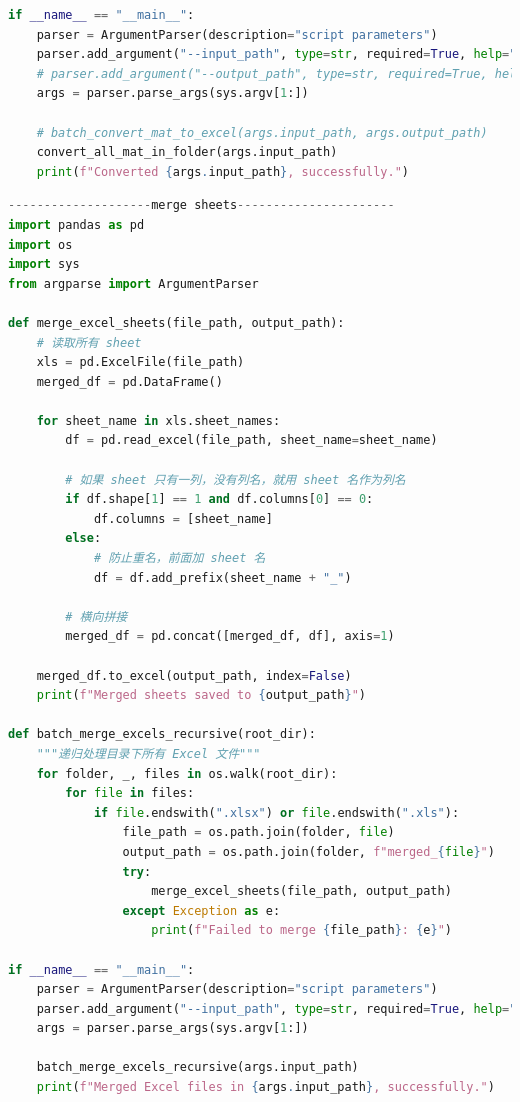 \documentclass[a4paper]{CPIPC}
\numberwithin{equation}{section}
\begin{document}
\begin{lstlisting}[language=Python]
if __name__ == "__main__":
    parser = ArgumentParser(description="script parameters")
    parser.add_argument("--input_path", type=str, required=True, help="Parent directory containing .mat files")
    # parser.add_argument("--output_path", type=str, required=True, help="Parent directory to save .xlsx files")
    args = parser.parse_args(sys.argv[1:])

    # batch_convert_mat_to_excel(args.input_path, args.output_path)
    convert_all_mat_in_folder(args.input_path)
    print(f"Converted {args.input_path}, successfully.")
\end{lstlisting}

\begin{lstlisting}[language=Python, caption=Merge Excel Sheets]
--------------------merge sheets----------------------
import pandas as pd
import os
import sys
from argparse import ArgumentParser

def merge_excel_sheets(file_path, output_path):
    # 读取所有 sheet
    xls = pd.ExcelFile(file_path)
    merged_df = pd.DataFrame()

    for sheet_name in xls.sheet_names:
        df = pd.read_excel(file_path, sheet_name=sheet_name)

        # 如果 sheet 只有一列，没有列名，就用 sheet 名作为列名
        if df.shape[1] == 1 and df.columns[0] == 0:
            df.columns = [sheet_name]
        else:
            # 防止重名，前面加 sheet 名
            df = df.add_prefix(sheet_name + "_")

        # 横向拼接
        merged_df = pd.concat([merged_df, df], axis=1)

    merged_df.to_excel(output_path, index=False)
    print(f"Merged sheets saved to {output_path}")

def batch_merge_excels_recursive(root_dir):
    """递归处理目录下所有 Excel 文件"""
    for folder, _, files in os.walk(root_dir):
        for file in files:
            if file.endswith(".xlsx") or file.endswith(".xls"):
                file_path = os.path.join(folder, file)
                output_path = os.path.join(folder, f"merged_{file}")
                try:
                    merge_excel_sheets(file_path, output_path)
                except Exception as e:
                    print(f"Failed to merge {file_path}: {e}")

if __name__ == "__main__":
    parser = ArgumentParser(description="script parameters")
    parser.add_argument("--input_path", type=str, required=True, help="Parent directory containing .mat files")
    args = parser.parse_args(sys.argv[1:])

    batch_merge_excels_recursive(args.input_path)
    print(f"Merged Excel files in {args.input_path}, successfully.")
\end{lstlisting}
\end{document}
